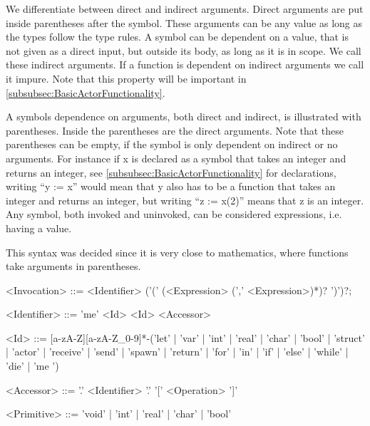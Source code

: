 We differentiate between direct and indirect arguments. Direct arguments are put inside parentheses after the symbol. These arguments can be any value as long as the types follow the type rules. A symbol can be dependent on a value, that is not given as a direct input, but outside its body, as long as it is in scope. We call these indirect arguments. If a function is dependent on indirect arguments we call it impure. Note that this property will be important in \cref{subsubsec:BasicActorFunctionality}. 

A symbols dependence on arguments, both direct and indirect, is illustrated with parentheses. Inside the parentheses are the direct arguments. Note that these parentheses can be empty, if the symbol is only dependent on indirect or no arguments. For instance if x is declared as a symbol that takes an integer and returns an integer, see \cref{subsubsec:BasicActorFunctionality} for declarations, writing \enquote{y := x} would mean that y also has to be a function that takes an integer and returns an integer, but writing \enquote{z := x(2)} means that z is an integer. Any symbol, both invoked and uninvoked, can be considered expressions, i.e. having a value.

This syntax was decided since it is very close to mathematics, where functions take arguments in parentheses.
\begin{grammar}
<Invocation> ::= <Identifier> ('(' (<Expression> (',' <Expression>)*)? ')')?;

<Identifier> ::= 'me'
 \alt <Id>
 \alt <Id> <Accessor>

<Id> ::= [a-zA-Z][a-zA-Z\_0-9]*-('let' | 'var' | 'int' | 'real' | 'char' | 'bool' | 'struct' | 'actor' | 'receive' | 'send' | 'spawn' | 'return' | 'for' | 'in' | 'if' | 'else' | 'while' | 'die' | 'me ')

<Accessor> ::= '.' <Identifier>
 \alt '.' '[' <Operation> ']'

<Primitive> ::= 'void' | 'int' | 'real' | 'char' | 'bool'
\end{grammar}

